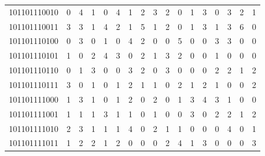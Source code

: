 \documentclass[10pt,a4paper]{article}
\begin{document}
\begin{longtable}{ |c|c|c|c|c|c|c|c|c|c|c|c|c|c|c|c|c| }
    101101110010              & 0                            & 4                                & 1                            & 0                              & 4   & 1   & 2   & 3   & 2   & 0   & 1   & 3   & 0   & 3   & 2   & 1   \\
    101101110011              & 3                            & 3                                & 1                            & 4                              & 2   & 1   & 5   & 1   & 2   & 0   & 1   & 3   & 1   & 3   & 6   & 0   \\
    101101110100              & 0                            & 3                                & 0                            & 1                              & 0   & 4   & 2   & 0   & 0   & 5   & 0   & 0   & 3   & 3   & 0   & 0   \\
    101101110101              & 1                            & 0                                & 2                            & 4                              & 3   & 0   & 2   & 1   & 3   & 2   & 0   & 0   & 1   & 0   & 0   & 0   \\
    101101110110              & 0                            & 1                                & 3                            & 0                              & 0   & 3   & 2   & 0   & 3   & 0   & 0   & 0   & 2   & 2   & 1   & 2   \\
    101101110111              & 3                            & 0                                & 1                            & 0                              & 1   & 2   & 1   & 1   & 0   & 2   & 1   & 2   & 1   & 0   & 0   & 2   \\
    101101111000              & 1                            & 3                                & 1                            & 0                              & 1   & 2   & 0   & 2   & 0   & 1   & 3   & 4   & 3   & 1   & 0   & 0   \\
    101101111001              & 1                            & 1                                & 1                            & 3                              & 1   & 1   & 0   & 1   & 0   & 0   & 3   & 0   & 2   & 2   & 1   & 2   \\
    101101111010              & 2                            & 3                                & 1                            & 1                              & 1   & 4   & 0   & 2   & 1   & 1   & 0   & 0   & 0   & 4   & 0   & 1   \\
    101101111011              & 1                            & 2                                & 2                            & 1                              & 2   & 0   & 0   & 0   & 2   & 4   & 1   & 3   & 0   & 0   & 0   & 3   \\

\end{longtable}
\end{document}
